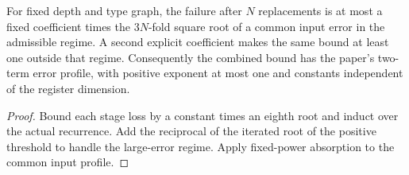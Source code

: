 \begin{lemma}
\label{lem:intro-recurrence-power}
\leanok
For fixed depth and type graph, the failure after $N$ replacements is at
most a fixed coefficient times the $3N$-fold square root of a common input
error in the admissible regime. A second explicit coefficient makes the
same bound at least one outside that regime. Consequently the combined
bound has the paper's two-term error profile, with positive exponent at
most one and constants independent of the register dimension.
\end{lemma}
\begin{proof}
\leanok
Bound each stage loss by a constant times an eighth root and induct over
the actual recurrence. Add the reciprocal of the iterated root of the
positive threshold to handle the large-error regime. Apply fixed-power
absorption to the common input profile.
\end{proof}

